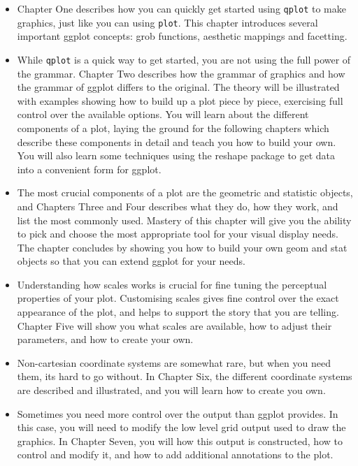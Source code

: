 \begin{itemize}
	\item Chapter One describes how you can quickly get started using {\tt qplot} to make graphics, just like you can using {\tt plot}.  This chapter introduces several important ggplot concepts: grob functions, aesthetic mappings and facetting.
	
	\item While {\tt qplot} is a quick way to get started, you are not using the full power of the grammar.  Chapter Two describes how the grammar of graphics and how the grammar of ggplot differs to the original.  The theory will be illustrated with examples showing how to build up a plot piece by piece, exercising full control over the available options.  You will learn about the different components of a plot, laying the ground for the following chapters which describe these components in detail and teach you how to build your own.  You will also learn some techniques using the reshape package to get data into a convenient form for ggplot.

	\item The most crucial components of a plot are the geometric and statistic objects, and Chapters Three and Four describes what they do, how they work, and list the most commonly used.  Mastery of this chapter will give you the ability to pick and choose the most appropriate tool for your visual display needs.  The chapter concludes by showing you how to build your own geom and stat objects so that you can extend ggplot for your needs.

	\item Understanding how scales works is crucial for fine tuning the perceptual properties of your plot.  Customising scales gives fine control over the exact appearance of the plot, and helps to support the story that you are telling.  Chapter Five will show you what scales are available, how to adjust their parameters, and how to create your own.

	\item Non-cartesian coordinate systems are somewhat rare, but when you need them, its hard to go without.  In Chapter Six, the different coordinate systems are described and illustrated, and you will learn how to create you own.
	
	
	\item Sometimes you need more control over the output than ggplot provides.  In this case, you will need to modify the low level grid output used to draw the graphics.  In Chapter Seven, you will how this output is constructed, how to control and modify it, and how to add additional annotations to the plot.

\end{itemize}

